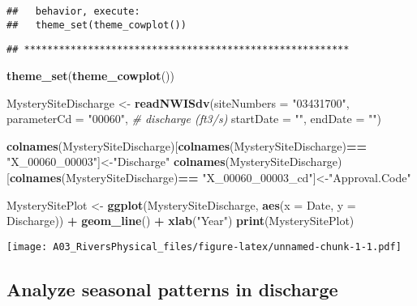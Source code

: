 \documentclass[]{article}
\newenvironment{Shaded}{\begin{snugshade}}{\end{snugshade}}
\newcommand{\CommentTok}[1]{\textcolor[rgb]{0.56,0.35,0.01}{\textit{#1}}}
\newcommand{\DataTypeTok}[1]{\textcolor[rgb]{0.13,0.29,0.53}{#1}}
\newcommand{\KeywordTok}[1]{\textcolor[rgb]{0.13,0.29,0.53}{\textbf{#1}}}
\newcommand{\NormalTok}[1]{#1}
\newcommand{\OperatorTok}[1]{\textcolor[rgb]{0.81,0.36,0.00}{\textbf{#1}}}
\newcommand{\StringTok}[1]{\textcolor[rgb]{0.31,0.60,0.02}{#1}}
\begin{document}
\begin{verbatim}
##   behavior, execute:
##   theme_set(theme_cowplot())
\end{verbatim}

\begin{verbatim}
## ********************************************************
\end{verbatim}

\begin{Shaded}
\begin{Highlighting}[]
\KeywordTok{theme_set}\NormalTok{(}\KeywordTok{theme_cowplot}\NormalTok{())}

\NormalTok{MysterySiteDischarge <-}\StringTok{ }\KeywordTok{readNWISdv}\NormalTok{(}\DataTypeTok{siteNumbers =} \StringTok{"03431700"}\NormalTok{,}
                        \DataTypeTok{parameterCd =} \StringTok{"00060"}\NormalTok{, }\CommentTok{# discharge (ft3/s)}
                        \DataTypeTok{startDate =} \StringTok{""}\NormalTok{,}
                        \DataTypeTok{endDate =} \StringTok{""}\NormalTok{)}

\KeywordTok{colnames}\NormalTok{(MysterySiteDischarge)[}\KeywordTok{colnames}\NormalTok{(MysterySiteDischarge)}\OperatorTok{==}
\StringTok{                                 "X_00060_00003"}\NormalTok{]<-}\StringTok{"Discharge"}
\KeywordTok{colnames}\NormalTok{(MysterySiteDischarge)[}\KeywordTok{colnames}\NormalTok{(MysterySiteDischarge)}\OperatorTok{==}
\StringTok{                                 "X_00060_00003_cd"}\NormalTok{]<-}\StringTok{"Approval.Code"}

\NormalTok{MysterySitePlot <-}\StringTok{ }
\StringTok{  }\KeywordTok{ggplot}\NormalTok{(MysterySiteDischarge, }\KeywordTok{aes}\NormalTok{(}\DataTypeTok{x =}\NormalTok{ Date, }\DataTypeTok{y =}\NormalTok{ Discharge)) }\OperatorTok{+}
\StringTok{         }\KeywordTok{geom_line}\NormalTok{() }\OperatorTok{+}
\StringTok{         }\KeywordTok{xlab}\NormalTok{(}\StringTok{"Year"}\NormalTok{)}
\KeywordTok{print}\NormalTok{(MysterySitePlot)}
\end{Highlighting}
\end{Shaded}

\texttt{[image: A03\_RiversPhysical\_files/figure-latex/unnamed-chunk-1-1.pdf]}

\hypertarget{analyze-seasonal-patterns-in-discharge}{%
\subsection{Analyze seasonal patterns in
discharge}\label{analyze-seasonal-patterns-in-discharge}}
\end{document}
